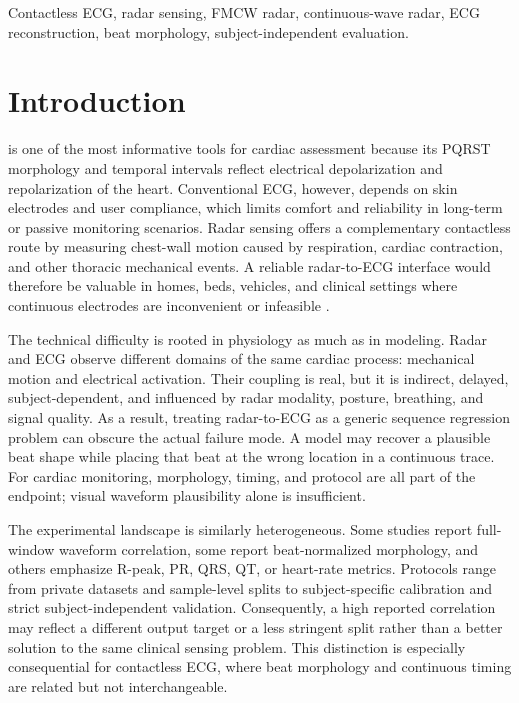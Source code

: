 \documentclass[lettersize,journal]{IEEEtran}
\begin{document}
\begin{IEEEkeywords}
Contactless ECG, radar sensing, FMCW radar, continuous-wave radar, ECG reconstruction, beat morphology, subject-independent evaluation.
\end{IEEEkeywords}

\section{Introduction}
 is one of the most informative tools for cardiac assessment because its PQRST morphology and temporal intervals reflect electrical depolarization and repolarization of the heart. Conventional ECG, however, depends on skin electrodes and user compliance, which limits comfort and reliability in long-term or passive monitoring scenarios. Radar sensing offers a complementary contactless route by measuring chest-wall motion caused by respiration, cardiac contraction, and other thoracic mechanical events. A reliable radar-to-ECG interface would therefore be valuable in homes, beds, vehicles, and clinical settings where continuous electrodes are inconvenient or infeasible \cite{zhang2023overview,chenmmwave,rssrnet,airecg,radarode,radarodemt}.

The technical difficulty is rooted in physiology as much as in modeling. Radar and ECG observe different domains of the same cardiac process: mechanical motion and electrical activation. Their coupling is real, but it is indirect, delayed, subject-dependent, and influenced by radar modality, posture, breathing, and signal quality. As a result, treating radar-to-ECG as a generic sequence regression problem can obscure the actual failure mode. A model may recover a plausible beat shape while placing that beat at the wrong location in a continuous trace. For cardiac monitoring, morphology, timing, and protocol are all part of the endpoint; visual waveform plausibility alone is insufficient.

The experimental landscape is similarly heterogeneous. Some studies report full-window waveform correlation, some report beat-normalized morphology, and others emphasize R-peak, PR, QRS, QT, or heart-rate metrics. Protocols range from private datasets and sample-level splits to subject-specific calibration and strict subject-independent validation. Consequently, a high reported correlation may reflect a different output target or a less stringent split rather than a better solution to the same clinical sensing problem. This distinction is especially consequential for contactless ECG, where beat morphology and continuous timing are related but not interchangeable.
\end{document}
